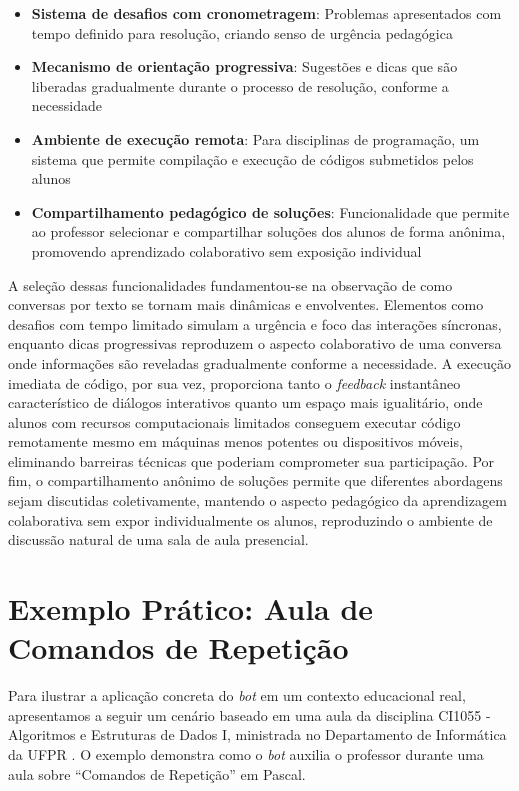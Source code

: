 \begin{itemize}
\item \textbf{Sistema de desafios com cronometragem}: Problemas apresentados 
com tempo definido para resolução, criando senso de urgência pedagógica
\item \textbf{Mecanismo de orientação progressiva}: Sugestões e dicas que são 
liberadas gradualmente durante o processo de resolução, conforme a necessidade
\item \textbf{Ambiente de execução remota}: Para disciplinas de programação, um
sistema que permite compilação e execução de códigos submetidos pelos alunos
\item \textbf{Compartilhamento pedagógico de soluções}: Funcionalidade que permite
ao professor selecionar e compartilhar soluções dos alunos de forma anônima, 
promovendo aprendizado colaborativo sem exposição individual
\end{itemize}

A seleção dessas funcionalidades fundamentou-se na observação de como conversas
por texto se tornam mais dinâmicas e envolventes. Elementos como desafios com
tempo limitado simulam a urgência e foco das interações síncronas, enquanto
dicas progressivas reproduzem o aspecto colaborativo de uma conversa onde
informações são reveladas gradualmente conforme a necessidade. A execução
imediata de código, por sua vez, proporciona tanto o \textit{feedback}
instantâneo característico de diálogos interativos quanto um espaço mais
igualitário, onde alunos com recursos computacionais limitados conseguem
executar código remotamente mesmo em máquinas menos potentes ou dispositivos
móveis, eliminando barreiras técnicas que poderiam comprometer sua
participação\cite{fabiane2024}. Por fim, o compartilhamento anônimo de soluções
permite que diferentes abordagens sejam discutidas coletivamente, mantendo o
aspecto pedagógico da aprendizagem colaborativa sem expor individualmente os
alunos, reproduzindo o ambiente de discussão natural de uma sala de aula
presencial.

\section{Exemplo Prático: Aula de Comandos de Repetição}
\label{sec:exemplo}

Para ilustrar a aplicação concreta do \textit{bot} em um contexto educacional
real, apresentamos a seguir um cenário baseado em uma aula da disciplina CI1055
- Algoritmos e Estruturas de Dados I, ministrada no Departamento de Informática
da UFPR \cite{ufpr2021ci1055}. O exemplo demonstra como o \textit{bot} auxilia o
professor durante uma aula sobre ``Comandos de Repetição'' em Pascal. 


